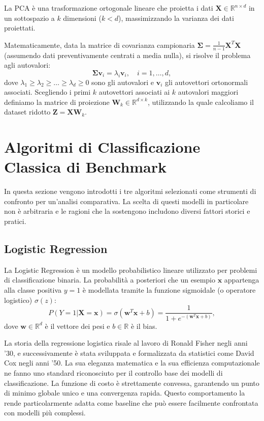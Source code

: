 La PCA è una trasformazione ortogonale lineare che proietta i dati $\mathbf{X} \in \mathbb{R}^{n \times d}$ in un sottospazio a $k$ dimensioni ($k < d$), massimizzando la varianza dei dati proiettati.

Matematicamente, data la matrice di covarianza campionaria $\boldsymbol{\Sigma} = \frac{1}{n-1} \mathbf{X}^T \mathbf{X}$ (assumendo dati preventivamente centrati a media nulla), si risolve il problema agli autovalori:
\begin{equation}
\boldsymbol{\Sigma} \mathbf{v}_i = \lambda_i \mathbf{v}_i, \quad i=1, \dots, d,
\end{equation}
dove $\lambda_1 \geq \lambda_2 \geq \dots \geq \lambda_d \geq 0$ sono gli autovalori e $\mathbf{v}_i$ gli autovettori ortonormali associati.
Scegliendo i primi $k$ autovettori associati ai $k$ autovalori maggiori definiamo la matrice di proiezione $\mathbf{W}_k \in \mathbb{R}^{d \times k}$, utilizzando la quale calcoliamo il dataset ridotto $\mathbf{Z} = \mathbf{X} \mathbf{W}_k$.

\section{Algoritmi di Classificazione Classica di Benchmark}
\label{sec:algoritmi_classificazione_classica}

In questa sezione vengono introdotti i tre algoritmi selezionati come strumenti di confronto per un'analisi comparativa. La scelta di questi modelli in particolare non è arbitraria e le ragioni che la sostengono includono diversi fattori storici e pratici.

\subsection{Logistic Regression}
La Logistic Regression è un modello probabilistico lineare utilizzato per problemi di classificazione binaria. La probabilità a posteriori che un esempio $\mathbf{x}$ appartenga alla classe positiva $y=1$ è modellata tramite la funzione sigmoidale (o operatore logistico) $\sigma(z)$:
\begin{equation}
P(Y=1 | \mathbf{X}=\mathbf{x}) = \sigma(\mathbf{w}^T \mathbf{x} + b) = \frac{1}{1 + e^{-(\mathbf{w}^T \mathbf{x} + b)}},
\end{equation}
dove $\mathbf{w} \in \mathbb{R}^d$ è il vettore dei pesi e $b \in \mathbb{R}$ è il bias.

La storia della regressione logistica risale al lavoro di Ronald Fisher negli anni '30, e successivamente è stata sviluppata e formalizzata da statistici come David Cox negli anni '50. La sua eleganza matematica e la sua efficienza computazionale ne fanno uno standard riconosciuto per il controllo base dei modelli di classificazione. La funzione di costo è strettamente convessa, garantendo un punto di minimo globale unico e una convergenza rapida. Questo comportamento la rende particolarmente adatta come baseline che può essere facilmente confrontata con modelli più complessi.


